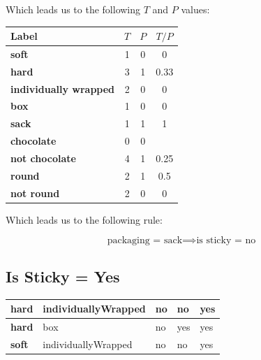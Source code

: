 \documentclass[12pt]{scrartcl}
\begin{document}
Which leads us to the following $T$ and $P$ values:

\begin{table}[H]
    \centering
    \begin{tabular}{|l|c|c|c|}
        \hline
        \textbf{Label}                 & $T$ & $P$ & $T/P$ \\\hline
        \textbf{soft}                 & 1   & 0   & 0 \\
        \textbf{hard}                 & 3   & 1   & 0.33 \\
        \textbf{individually wrapped} & 2   & 0   & 0 \\
        \textbf{box}                  & 1   & 0   & 0 \\
        \textbf{sack}                 & 1   & 1   & 1 \\
        \textbf{chocolate}            & 0   & 0   & \\
        \textbf{not chocolate}        & 4   & 1   & 0.25 \\
        \textbf{round}                & 2   & 1   & 0.5 \\
        \textbf{not round}            & 2   & 0   & 0 \\\hline
    \end{tabular}
\end{table}

Which leads us to the following rule:

\begin{equation*}
    \text{packaging = sack} \implies \text{is sticky = no}
\end{equation*}


\subsection{Is Sticky = Yes}
\begin{table}[H]
    \centering
    \begin{tabular}{|l|l|l|l|l|}
        \hline
        \textbf{hard} & \textbf{individuallyWrapped} & \textbf{no} & \textbf{no} & \textbf{yes} \\\hline
        \textbf{hard} & box                          & no          & yes         & yes \\
        \textbf{soft} & individuallyWrapped          & no          & no          & yes \\\hline
    \end{tabular}
\end{table}
\end{document}
